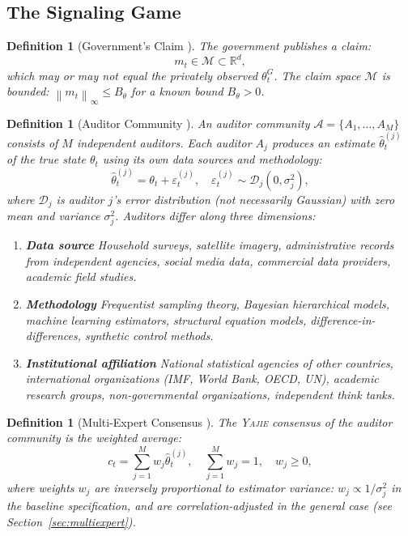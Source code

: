 \documentclass[11pt,a4paper]{article}
\newtheorem{definition}[theorem]{Definition}
\theoremstyle{definition}
\newcommand{\Yajie}{\textsc{Yajie}}
\newcommand{\R}{\mathbb{R}}
\newcommand{\norm}[1]{\left\lVert#1\right\rVert}
\newcommand{\claimSpace}{\mathcal{M}}
\newcommand{\auditorSet}{\mathcal{A}}
\begin{document}
\subsection{The Signaling Game}
\begin{definition}[Government's Claim ]
\label{def:claim}
The government publishes a claim:
\begin{equation}
    m_t \in \claimSpace \subset \R^d,
    \label{eq:claim}
\end{equation}
which may or may not equal the privately observed $\theta_t^G$. The claim space $\claimSpace$ is bounded: $\norm{m_t}_\infty \leq B_\theta$ for a known bound $B_\theta > 0$.
\end{definition}
\begin{definition}[Auditor Community ]
\label{def:auditors}
An auditor community $\auditorSet = \{A_1, \ldots, A_M\}$ consists of $M$ independent auditors. Each auditor $A_j$ produces an estimate $\hat{\theta}_t^{(j)}$ of the true state $\theta_t$ using its own data sources and methodology:
\begin{equation}
    \hat{\theta}_t^{(j)} = \theta_t + \varepsilon_t^{(j)}, \quad \varepsilon_t^{(j)} \sim \mathcal{D}_j(0, \sigma_j^2),
    \label{eq:auditor_estimate}
\end{equation}
where $\mathcal{D}_j$ is auditor $j$'s error distribution (not necessarily Gaussian) with zero mean and variance $\sigma_j^2$.
Auditors differ along three dimensions:
\begin{enumerate}[label=(\roman*)]
    \item \textbf{Data source} Household surveys, satellite imagery, administrative records from independent agencies, social media data, commercial data providers, academic field studies.
    \item \textbf{Methodology} Frequentist sampling theory, Bayesian hierarchical models, machine learning estimators, structural equation models, difference-in-differences, synthetic control methods.
    \item \textbf{Institutional affiliation} National statistical agencies of other countries, international organizations (IMF, World Bank, OECD, UN), academic research groups, non-governmental organizations, independent think tanks.
\end{enumerate}
\end{definition}
\begin{definition}[Multi-Expert Consensus ]
\label{def:consensus}
The \Yajie{} consensus of the auditor community is the weighted average:
\begin{equation}
    c_t = \sum_{j=1}^{M} w_j \hat{\theta}_t^{(j)}, \quad \sum_{j=1}^{M} w_j = 1, \quad w_j \geq 0,
    \label{eq:consensus}
\end{equation}
where weights $w_j$ are inversely proportional to estimator variance: $w_j \propto 1/\sigma_j^2$ in the baseline specification, and are correlation-adjusted in the general case (see Section~\ref{sec:multiexpert}).
\end{definition}
\end{document}
